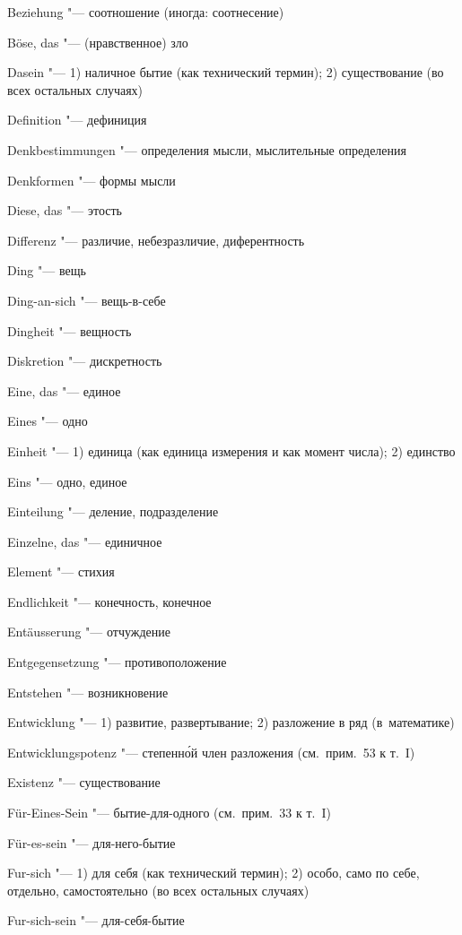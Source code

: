 \begin{multicols}{2}
Beziehung "--- соотношение (иногда: соотнесение)

Böse, das "--- (нравственное) зло

\bigskip

Dasein "--- 1) наличное бытие (как технический термин); 2)
существование (во всех остальных случаях)

Definition "--- дефиниция

Denk\-bestim\-mun\-gen "--- определения мысли, мыслительные определения

Denkformen "--- формы мысли

Diese, das "--- этость

Differenz "--- различие, небезразличие, диферентность

Ding "--- вещь

Ding-an-sich "--- вещь-в-себе

Dingheit "--- вещность

Diskretion "--- дискретность

\bigskip

Eine, das "--- единое

Eines "--- одно

Einheit "--- 1) единица (как единица измерения и как момент числа); 2) единство

Eins "--- одно, единое

Einteilung "--- деление, подразделение

Einzelne, das "--- единичное

Element "--- стихия

Endlichkeit "--- конечность, конечное

Entäusserung "--- отчуждение

Entgegensetzung "--- противоположение

Entstehen "--- возникновение

Entwicklung "--- 1) развитие, развертывание; 2) разложение в ряд (в~математике)

Ent\-wick\-lungs\-po\-tenz "--- степенн\'{о}й член разложения
(см.~прим.~53 к т.~I)

Existenz "--- существование

\bigskip

Für-Eines-Sein "--- бытие-для-одного (см.~прим.~33 к т.~I)

Für-es-sein "--- для-него-бытие

Fur-sich "--- 1) для себя (как технический термин); 2) особо,
само по себе, отдельно, самостоятельно (во всех остальных случаях)

Fur-sich-sein "--- для-себя-бытие


\end{multicols}
